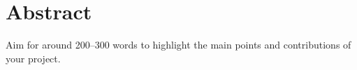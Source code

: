 \chapter*{Abstract}

Aim for around 200–300 words to highlight the main points and
contributions of your project.
